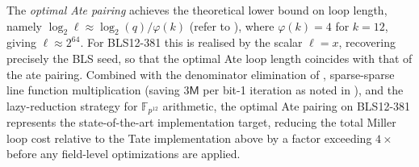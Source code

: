 The \emph{optimal Ate pairing} achieves the theoretical lower bound
on loop length, namely $\log_2 \ell \approx \log_2(q)/\varphi(k)$
(refer to ), where $\varphi(k) = 4$
for $k = 12$, giving $\ell \approx 2^{64}$.
For BLS12-381 this is realised by the scalar $\ell = x$, recovering
precisely the BLS seed, so that the optimal Ate loop length coincides
with that of the ate pairing. 
Combined with the denominator elimination of , sparse-sparse line function multiplication (saving $3\mathsf{M}$ per bit-1 iteration as
noted in ), and the lazy-reduction strategy for $\mathbb{F}_{p^{12}}$ arithmetic, the optimal Ate pairing on BLS12-381 represents the state-of-the-art implementation target, reducing the total Miller loop cost relative to the Tate implementation above by a factor exceeding $4\times$ before any field-level
optimizations are applied. 



